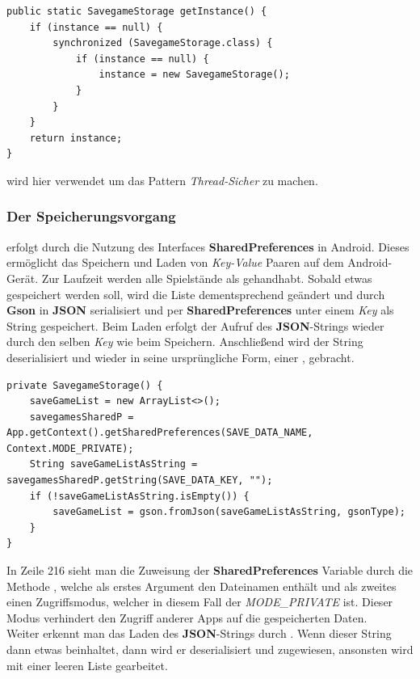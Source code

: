 \begin{lstlisting}[caption={SavegameStorage Singleton},captionpos=b]
public static SavegameStorage getInstance() {
	if (instance == null) {
		synchronized (SavegameStorage.class) {
			if (instance == null) {
				instance = new SavegameStorage();
			}
		}
	}
	return instance;
}
\end{lstlisting}

 wird hier verwendet um das Pattern \emph{Thread-Sicher} zu
machen.

\subsubsection{Der Speicherungsvorgang}

erfolgt durch die Nutzung des Interfaces \textbf{SharedPreferences} in Android.
Dieses ermöglicht das Speichern und Laden von \emph{Key-Value} Paaren auf dem
Android-Gerät. Zur Laufzeit werden alle Spielstände als
 gehandhabt. Sobald etwas gespeichert werden soll,
wird die Liste dementsprechend geändert und durch \textbf{Gson} in \textbf{JSON}
serialisiert und per \textbf{SharedPreferences} unter einem \emph{Key} als
String gespeichert. Beim Laden erfolgt der Aufruf des \textbf{JSON}-Strings
wieder durch den selben \emph{Key} wie beim Speichern. Anschließend wird der
String deserialisiert und wieder in seine ursprüngliche Form, einer 
, gebracht.

\begin{lstlisting}[caption={SavegameStorage Konstruktor},captionpos=b]
private SavegameStorage() {
	saveGameList = new ArrayList<>();
	savegamesSharedP = App.getContext().getSharedPreferences(SAVE_DATA_NAME, Context.MODE_PRIVATE);
	String saveGameListAsString = savegamesSharedP.getString(SAVE_DATA_KEY, "");
	if (!saveGameListAsString.isEmpty()) {
		saveGameList = gson.fromJson(saveGameListAsString, gsonType);
	}
}
\end{lstlisting}

In Zeile 216 sieht man die Zuweisung der \textbf{SharedPreferences} Variable
durch die Methode , welche als erstes
Argument den Dateinamen enthält und als zweites einen Zugriffsmodus, welcher in
diesem Fall der \emph{MODE\_PRIVATE} ist. Dieser Modus verhindert den Zugriff
anderer Apps auf die gespeicherten Daten.\\ Weiter erkennt man das Laden des
\textbf{JSON}-Strings durch .
Wenn dieser String dann etwas beinhaltet, dann wird er deserialisiert und
zugewiesen, ansonsten wird mit einer leeren Liste gearbeitet.

